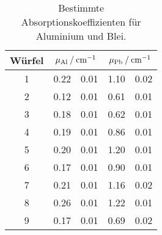 \begin{table}
\centering
\caption{Bestimmte Absorptionskoeffizienten für Aluminium und Blei.}
\label{tab: results_mu}
\begin{tabular}{S S[table-format=1.2]@{${}\pm{}$} S[table-format=1.2] S[table-format=1.2]@{${}\pm{}$} S[table-format=1.2] }
\toprule
{Würfel} &  &  \\
 & 0.22 & 0.01 & 1.10 & 0.02\\
2 & 0.12 & 0.01 & 0.61 & 0.01\\
3 & 0.18 & 0.01 & 0.62 & 0.01\\
4 & 0.19 & 0.01 & 0.86 & 0.01\\
5 & 0.20 & 0.01 & 1.20 & 0.01\\
6 & 0.17 & 0.01 & 0.90 & 0.01\\
7 & 0.21 & 0.01 & 1.16 & 0.02\\
8 & 0.26 & 0.01 & 1.22 & 0.01\\
9 & 0.17 & 0.01 & 0.69 & 0.02\\
\bottomrule
\end{tabular}
\end{table}
